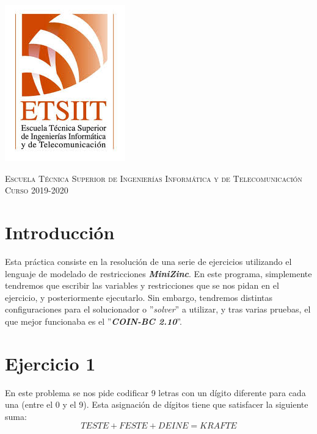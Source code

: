 \documentclass[11pt,a4paper]{article}
\begin{document}
\begin{titlepage}
\begin{minipage}{\textwidth}
\includegraphics[scale=0.3]{img/etsiit.jpeg}

\vspace{0.7cm}
\textsc{Escuela Técnica Superior de Ingenierías Informática y de Telecomunicación}\\
\vspace{1cm}
\textsc{Curso 2019-2020}
\end{minipage}
\end{titlepage}

\tableofcontents
\thispagestyle{empty}				%

\newpage

\setlength{\parskip}{1em}
\setcounter{page}{1}

\section*{Introducción}

Esta práctica consiste en la resolución de una serie de ejercicios utilizando el lenguaje de modelado de restricciones \textbf{\textit{MiniZinc}}.
En este programa, simplemente tendremos que escribir las variables y restricciones que se nos pidan en el ejercicio, y posteriormente ejecutarlo.
Sin embargo, tendremos distintas configuraciones para el solucionador o ''\textit{solver}'' a utilizar, y tras varias pruebas, el que mejor
funcionaba es el ''\textbf{\textit{COIN-BC 2.10}}''.



\section*{Ejercicio 1}
En este problema se nos pide codificar 9 letras con un dígito diferente para cada una (entre el 0 y el 9). Esta asignación de dígitos tiene que
satisfacer la siguiente suma:
\begin{equation*}
    TESTE+FESTE+DEINE=KRAFTE
\end{equation*}
\end{document}
